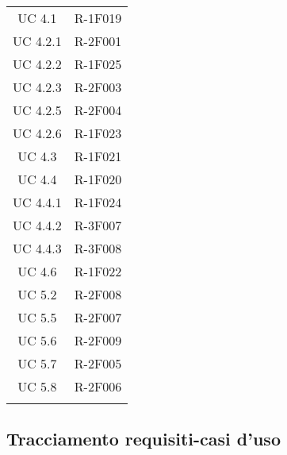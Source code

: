 \begin{tabularx}{\textwidth}{c|c}
	UC 4.1 &  R-1F019  \\ 
	UC 4.2.1 &  R-2F001  \\ 
	UC 4.2.2 &  R-1F025  \\ 
	UC 4.2.3 &  R-2F003  \\ 
	UC 4.2.5 &  R-2F004  \\ 
	UC 4.2.6 &  R-1F023  \\ 
	UC 4.3 &  R-1F021  \\ 
	UC 4.4 &  R-1F020  \\ 
	UC 4.4.1 &  R-1F024  \\ 
	UC 4.4.2 &  R-3F007  \\ 
	UC 4.4.3 &  R-3F008  \\ 
	UC 4.6 &  R-1F022  \\ 
	UC 5.2 &  R-2F008  \\ 
	UC 5.5 &  R-2F007  \\ 
	UC 5.6 &  R-2F009  \\ 
	UC 5.7 &  R-2F005  \\ 
	UC 5.8 &  R-2F006  \\ 
	
	\rowcolor{white}
	\caption{Tabella tracciamento casi d'uso-requisiti} \label{tab:tabellacasirequisiti}
\end{tabularx}



\subsection{Tracciamento requisiti-casi d'uso} 

